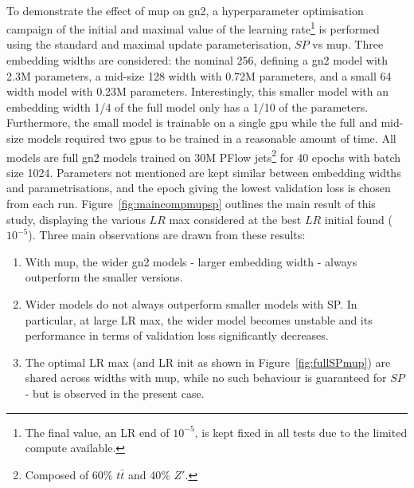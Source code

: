 \paragraph{}To demonstrate the effect of \gls{mup} on \gls{gn2}, a hyperparameter optimisation campaign of the initial and maximal value of the learning rate\footnote{The final value, an LR end of $10^{-5}$, is kept fixed in all tests due to the limited compute available.} is performed using the standard and maximal update parameterisation, $SP$ vs \gls{mup}. Three embedding widths are considered: the nominal 256, defining a \gls{gn2} model with 2.3M parameters, a mid-size 128 width with 0.72M parameters, and a small 64 width model with 0.23M parameters. Interestingly, this smaller model with an embedding width 1/4 of the full model only has a 1/10 of the parameters. Furthermore, the small model is trainable on a single \gls{gpu} while the full and mid-size models required two \glspl{gpu} to be trained in a reasonable amount of time. All models are full \gls{gn2} models trained on 30M PFlow jets\footnote{Composed of 60\% $t\bar{t}$ and 40\% $Z'$.} for 40 epochs with batch size 1024. Parameters not mentioned are kept similar between embedding widths and parametrisations, and the epoch giving the lowest validation loss is chosen from each run. Figure~\ref{fig:maincompmupsp} outlines the main result of this study, displaying the various $LR$ max considered at the best $LR$ initial found ($10^{-5}$). Three main observations are drawn from these results:
\begin{enumerate}
  \item With \gls{mup}, the wider \gls{gn2} models - larger embedding width - always outperform the smaller versions. 
  \item Wider models do not always outperform smaller models with SP. In particular, at large LR max, the wider model becomes unstable and its performance in terms of validation loss significantly decreases.
  \item The optimal LR max (and LR init as shown in Figure~\ref{fig:fullSPmup}) are shared across widths with \gls{mup}, while no such behaviour is guaranteed for $SP$ - but is observed in the present case.
\end{enumerate}

